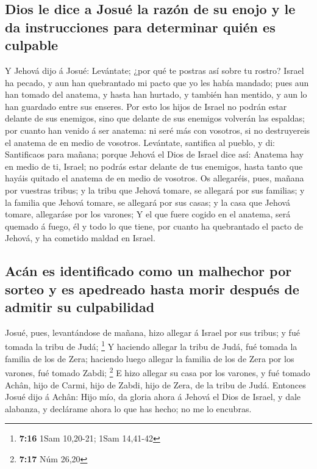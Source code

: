 \hypertarget{dios-le-dice-a-josuuxe9-la-razuxf3n-de-su-enojo-y-le-da-instrucciones-para-determinar-quiuxe9n-es-culpable}{%
\subsection{Dios le dice a Josué la razón de su enojo y le da
instrucciones para determinar quién es
culpable}\label{dios-le-dice-a-josuuxe9-la-razuxf3n-de-su-enojo-y-le-da-instrucciones-para-determinar-quiuxe9n-es-culpable}}

 Y Jehová dijo á Josué: Levántate; ¿por qué te postras así
sobre tu rostro?  Israel ha pecado, y aun han quebrantado
mi pacto que yo les había mandado; pues aun han tomado del anatema, y
hasta han hurtado, y también han mentido, y aun lo han guardado entre
sus enseres.  Por esto los hijos de Israel no podrán estar
delante de sus enemigos, sino que delante de sus enemigos volverán las
espaldas; por cuanto han venido á ser anatema: ni seré más con vosotros,
si no destruyereis el anatema de en medio de vosotros. 
Levántate, santifica al pueblo, y di: Santificaos para mañana; porque
Jehová el Dios de Israel dice así: Anatema hay en medio de ti, Israel;
no podrás estar delante de tus enemigos, hasta tanto que hayáis quitado
el anatema de en medio de vosotros.  Os allegaréis, pues,
mañana por vuestras tribus; y la tribu que Jehová tomare, se allegará
por sus familias; y la familia que Jehová tomare, se allegará por sus
casas; y la casa que Jehová tomare, allegaráse por los varones;
 Y el que fuere cogido en el anatema, será quemado á fuego,
él y todo lo que tiene, por cuanto ha quebrantado el pacto de Jehová, y
ha cometido maldad en Israel.

\hypertarget{acuxe1n-es-identificado-como-un-malhechor-por-sorteo-y-es-apedreado-hasta-morir-despuuxe9s-de-admitir-su-culpabilidad}{%
\subsection{Acán es identificado como un malhechor por sorteo y es
apedreado hasta morir después de admitir su
culpabilidad}\label{acuxe1n-es-identificado-como-un-malhechor-por-sorteo-y-es-apedreado-hasta-morir-despuuxe9s-de-admitir-su-culpabilidad}}

 Josué, pues, levantándose de mañana, hizo allegar á Israel
por sus tribus; y fué tomada la tribu de Judá; \footnote{\textbf{7:16}
  1Sam 10,20-21; 1Sam 14,41-42}  Y haciendo allegar la
tribu de Judá, fué tomada la familia de los de Zera; haciendo luego
allegar la familia de los de Zera por los varones, fué tomado Zabdi;
\footnote{\textbf{7:17} Núm 26,20}  E hizo allegar su casa
por los varones, y fué tomado Achân, hijo de Carmi, hijo de Zabdi, hijo
de Zera, de la tribu de Judá.  Entonces Josué dijo á Achân:
Hijo mío, da gloria ahora á Jehová el Dios de Israel, y dale alabanza, y
declárame ahora lo que has hecho; no me lo encubras.

